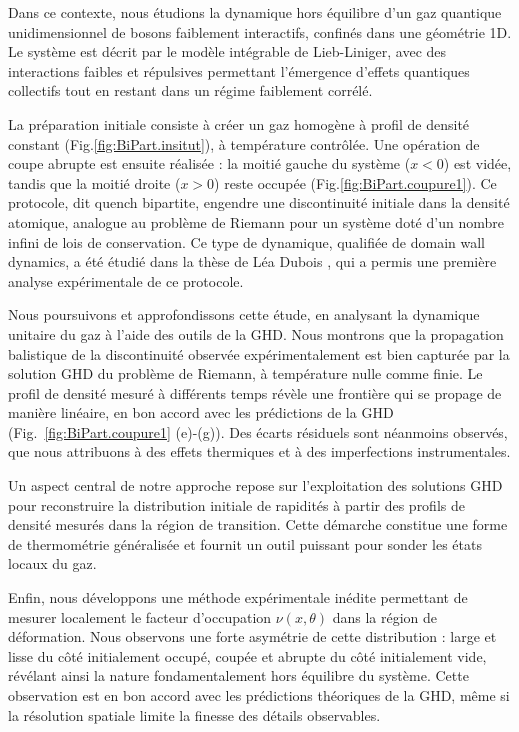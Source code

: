 Dans ce contexte, nous étudions la dynamique hors équilibre d’un gaz quantique unidimensionnel de bosons faiblement interactifs, confinés dans une géométrie 1D. Le système est décrit par le modèle intégrable de Lieb-Liniger, avec des interactions faibles et répulsives permettant l’émergence d’effets quantiques collectifs tout en restant dans un régime faiblement corrélé.

La préparation initiale consiste à créer un gaz homogène à profil de densité constant (Fig.\ref{fig:BiPart.insitut}), à température contrôlée. Une opération de coupe abrupte est ensuite réalisée : la moitié gauche du système ($x<0$) est vidée, tandis que la moitié droite ($x>0$) reste occupée (Fig.\ref{fig:BiPart.coupure1}). Ce protocole, dit quench bipartite, engendre une discontinuité initiale dans la densité atomique, analogue au problème de Riemann pour un système doté d’un nombre infini de lois de conservation. Ce type de dynamique, qualifiée de domain wall dynamics, a été étudié dans la thèse de Léa Dubois \cite{DuboisThese}, qui a permis une première analyse expérimentale de ce protocole.

Nous poursuivons et approfondissons cette étude, en analysant la dynamique unitaire du gaz à l’aide des outils de la GHD. Nous montrons que la propagation balistique de la discontinuité observée expérimentalement est bien capturée par la solution GHD du problème de Riemann, à température nulle comme finie. Le profil de densité mesuré à différents temps révèle une frontière qui se propage de manière linéaire, en bon accord avec les prédictions de la GHD (Fig.~\ref{fig:BiPart.coupure1} (e)-(g)). Des écarts résiduels sont néanmoins observés, que nous attribuons à des effets thermiques et à des imperfections instrumentales.

Un aspect central de notre approche repose sur l’exploitation des solutions GHD pour reconstruire la distribution initiale de rapidités à partir des profils de densité mesurés dans la région de transition. Cette démarche constitue une forme de thermométrie généralisée et fournit un outil puissant pour sonder les états locaux du gaz.

Enfin, nous développons une méthode expérimentale inédite permettant de mesurer localement le facteur d’occupation $\nu(x, \theta)$ dans la région de déformation. Nous observons une forte asymétrie de cette distribution : large et lisse du côté initialement occupé, coupée et abrupte du côté initialement vide, révélant ainsi la nature fondamentalement hors équilibre du système. Cette observation est en bon accord avec les prédictions théoriques de la GHD, même si la résolution spatiale limite la finesse des détails observables.

